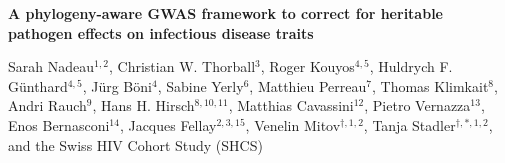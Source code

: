 \documentclass[11pt]{article}
\begin{document}

\begin{center}
	\Large{\textbf{A phylogeny-aware GWAS framework to correct for heritable pathogen effects on infectious disease traits}}
\end{center}
\vspace{4pt}

\begin{flushleft}
	Sarah Nadeau$^{1,2}$, Christian W. Thorball$^{3}$, Roger Kouyos$^{4,5}$, Huldrych F. Günthard$^{4,5}$, Jürg Böni$^{4}$, Sabine Yerly$^6$, Matthieu Perreau$^{7}$, Thomas Klimkait$^{8}$, Andri Rauch$^{9}$, Hans H. Hirsch$^{8,10,11}$, Matthias Cavassini$^{12}$, Pietro Vernazza$^{13}$, Enos Bernasconi$^{14}$, Jacques Fellay$^{2,3,15}$, Venelin Mitov$^{\dagger,1,2}$, Tanja Stadler$^{\dagger,\ast,1,2}$, and the Swiss HIV Cohort Study (SHCS)
\end{flushleft}
\end{document}
